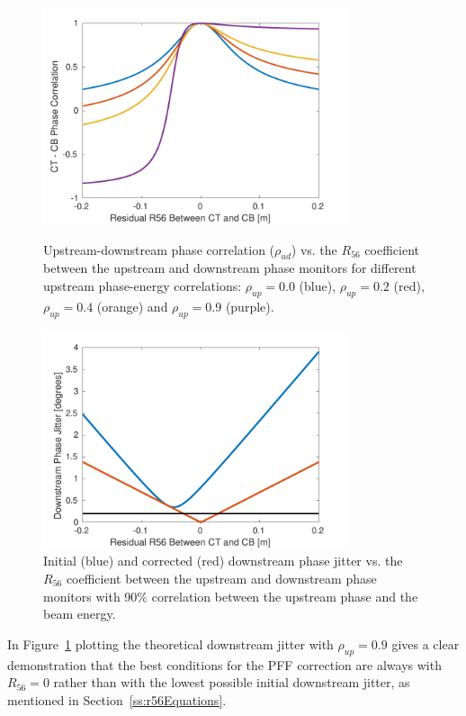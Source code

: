 \begin{figure}
  \centering
  \includegraphics[width=0.8\textwidth]{Figures/propagation/corrVsR56_CTENCorr}
  \caption{Upstream-downstream phase correlation (\(\rho_{ud}\)) vs. the \(R_{56}\) coefficient between the upstream and downstream phase monitors for different upstream phase-energy correlations: \(\rho_{up}=0.0\) (blue), \(\rho_{up}=0.2\) (red), \(\rho_{up}=0.4\) (orange) and \(\rho_{up}=0.9\) (purple).}
  \label{f:corrVsR56_CTENCorr}
  \includegraphics[width=0.8\textwidth]{Figures/propagation/jitVsR56_90ctencorr}
  \caption{Initial (blue) and corrected (red) downstream phase jitter vs. the \(R_{56}\) coefficient between the upstream and downstream phase monitors with 90\% correlation between the upstream phase and the beam energy.}
  \label{f:jitVsR56_90ctencorr}
\end{figure}


In Figure~\ref{f:jitVsR56_90ctencorr} plotting the theoretical downstream jitter with \(\rho_{up} = 0.9\) gives a clear demonstration that the best conditions for the PFF correction are always with \(R_{56} = 0\) rather than with the lowest possible initial downstream jitter, as mentioned in Section~\ref{ss:r56Equations}. %


